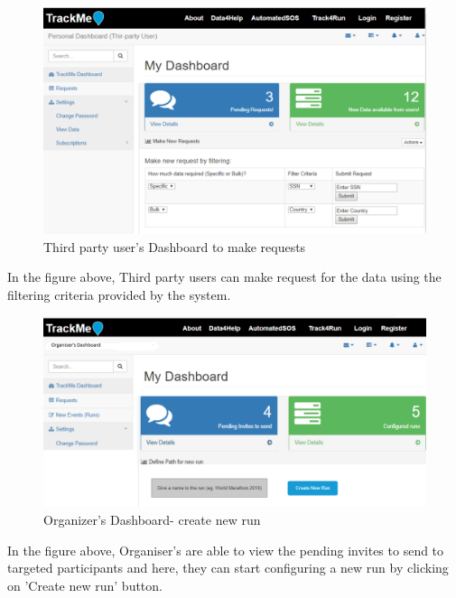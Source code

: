 \documentclass[hidelinks, 12pt]{report}
\begin{document}
	\begin{figure}[H]
		\centering
		\includegraphics[scale=0.35]{../Assets/Make_Request.png}\caption[UI: Third party user's Dashboard to make requests]{Third party user's Dashboard to make requests}
		\label{fig:Make_Request}
	\end{figure}
	
	In the figure above, Third party users can make request for the data using the filtering criteria provided by the system.
	
	\begin{figure}[H]
		\centering
		\includegraphics[scale=0.35]{../Assets/organizer_dashboard_1.png}\caption[UI: Organiser's Dashboard - create new run]{Organizer's Dashboard- create new run}
		\label{fig:Make_Request}
	\end{figure}
	In the figure above, Organiser's are able to view the pending invites to send to targeted participants and here, they can start configuring a new run by clicking on 'Create new run' button.
	
\end{document}
